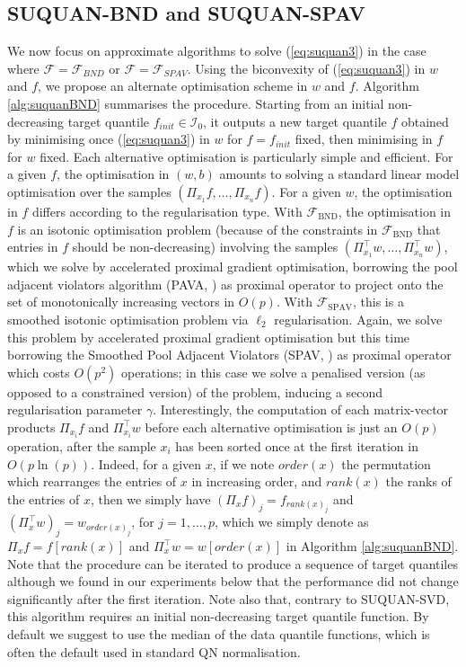 \documentclass{article}
\newcommand{\Fcal}{\mathcal{F}}
\newcommand{\Ical}{\mathcal{I}}
\begin{document}
\subsection{SUQUAN-BND and SUQUAN-SPAV} 
We now focus on approximate algorithms to solve (\ref{eq:suquan3}) in the case where $\Fcal=\Fcal_{BND}$ or $\Fcal = \Fcal_{SPAV}$. Using the biconvexity of (\ref{eq:suquan3}) in $w$ and $f$, we propose an alternate optimisation scheme in $w$ and $f$. Algorithm \ref{alg:suquanBND} summarises the procedure. Starting from an initial non-decreasing target quantile $f_{init}\in\Ical_0$, it outputs a new target quantile $f$ obtained by minimising once (\ref{eq:suquan3}) in $w$ for $f=f_{init}$ fixed, then minimising in $f$ for $w$ fixed. Each alternative optimisation is particularly simple and efficient. For a given $f$, the optimisation in $(w,b)$ amounts to solving a standard linear model optimisation over the samples $\left(\Pi_{x_1}f , \ldots , \Pi_{x_n}f\right)$. For a given $w$, the optimisation in $f$ differs according to the regularisation type. With $\Fcal_{\text{BND}}$, the optimisation in $f$ is an isotonic optimisation problem (because of the constraints in $\Fcal_{\text{BND}}$ that entries in $f$ should be non-decreasing) involving the samples $\left(\Pi_{x_1}^\top w , \ldots , \Pi_{x_n}^\top w\right)$, which we solve by accelerated proximal gradient optimisation, borrowing the pool adjacent violators algorithm (PAVA, \cite{Barlow1972Statistical}) as proximal operator to project onto the set of monotonically increasing vectors in $O(p)$. With $\Fcal_{\text{SPAV}}$, this is a smoothed isotonic optimisation problem via $\ell_2$ regularisation. Again, we solve this problem by accelerated proximal gradient optimisation but this time borrowing the Smoothed Pool Adjacent Violators (SPAV, \cite{Sysoev2016smoothed}) as proximal operator which costs $O(p^2)$ operations; in this case we solve a penalised version (as opposed to a constrained version) of the problem, inducing a second regularisation parameter $\gamma$. Interestingly, the computation of each matrix-vector products $\Pi_{x_i} f$ and $\Pi_{x_i}^\top w$ before each alternative optimisation is just an $O(p)$ operation, after the sample $x_i$ has been sorted once at the first iteration in $O(p\ln(p))$. Indeed, for a given $x$, if we note $order(x)$ the permutation which rearranges the entries of $x$ in increasing order, and $rank(x)$ the ranks of the entries of $x$, then we simply have $(\Pi_x f)_j = f_{rank(x)_j}$ and $(\Pi_x^\top w)_j = w_{order(x)_j}$, for $j=1,\ldots,p$, which we simply denote as $\Pi_x f = f[rank(x)]$ and $\Pi_x^\top w = w[order(x)]$ in Algorithm \ref{alg:suquanBND}. Note that the procedure can be iterated to produce a sequence of target quantiles although we found in our experiments below that the performance did not change significantly after the first iteration. Note also that, contrary to SUQUAN-SVD, this algorithm requires an initial non-decreasing target quantile function. By default we suggest to use the median of the data quantile functions, which is often the default used in standard QN normalisation.
\end{document}
